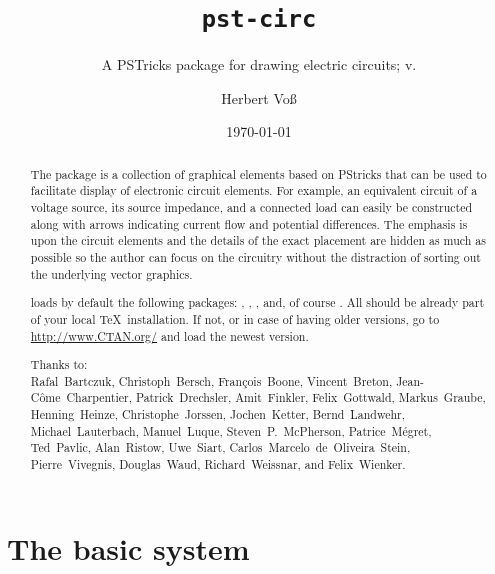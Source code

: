 \documentclass[11pt,english,BCOR=10mm,DIV=12,bibliography=totoc,parskip=false,headings=small,
    headinclude=false,footinclude=false,twoside,english]{pst-doc}
\let\pstCircFV\fileversion
\begin{document}
\title{\texttt{pst-circ}}
\subtitle{A PSTricks package for drawing electric circuits; v.\pstCircFV}
\author{%
Herbert Vo\ss}
\date{\today}
\settitle

\tableofcontents


\begin{abstract}
\noindent
The package  is a collection of graphical elements based
on PStricks that can be used to facilitate display of electronic
circuit elements. For example, an equivalent circuit of a voltage
source, its source impedance, and a connected load can easily be
constructed along with arrows indicating current flow and potential
differences. The emphasis is upon the circuit elements and the
details of the exact placement are hidden as much as possible so the
author can focus on the circuitry without the distraction of sorting
out the underlying vector graphics.

 loads by default the following packages: , 
, , and, of course .
All should be already part of your local \TeX\ installation. If not, or in case
of having older versions, go to \url{http://www.CTAN.org/} and load the newest version.

\vfill\noindent
\raggedright
\begin{sloppypar}
Thanks to: \\
\mbox{Rafal Bartczuk},
\mbox{Christoph Bersch}, 
\mbox{Fran\c{c}ois Boone}, 
\mbox{Vincent Breton},
    \mbox{Jean-C\^ome Charpentier},
    \mbox{Patrick Drechsler},
    \mbox{Amit Finkler},
    \mbox{Felix Gottwald},
    \mbox{Markus Graube},
    \mbox{Henning Heinze},
    \mbox{Christophe Jorssen},
    \mbox{Jochen Ketter},
    \mbox{Bernd Landwehr},
    \mbox{Michael Lauterbach},
    \mbox{Manuel Luque}, 
    \mbox{Steven P. McPherson}, 
    \mbox{Patrice Mégret},
    \mbox{Ted Pavlic}, 
    \mbox{Alan Ristow},
    \mbox{Uwe Siart},
    \mbox{Carlos Marcelo de Oliveira Stein}, 
    \mbox{Pierre Vivegnis},
\mbox{Douglas Waud}, 
\mbox{Richard Weissnar}, and
\mbox{Felix Wienker}.
\end{sloppypar}
\end{abstract}

\clearpage

\section{The basic system}
\end{document}
